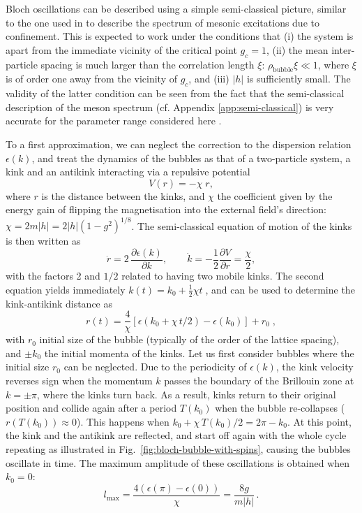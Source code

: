 \documentclass[amsmath,amssymb,11pt]{article}
\numberwithin{equation}{section}
\numberwithin{figure}{section}
\numberwithin{table}{section}
\begin{document}
{Bloch oscillations can be described using a simple semi-classical picture, similar to the one used in \cite{2008JSP...131..917R} to describe the spectrum of mesonic excitations due to confinement. This is expected to work under the conditions that (i) the system is apart from the immediate vicinity of the critical point $g_c=1$, (ii) the mean inter-particle spacing is much larger than the correlation length $\xi$: $\rho_\mathrm{bubble}\xi\ll 1$, where $\xi$ is of order one away from the vicinity of $g_c$, and (iii) $|h|$ is sufficiently small. The validity of the latter condition can be seen from the fact that the semi-classical description of the meson spectrum (cf. Appendix \ref{app:semi-classical}) is very accurate for the parameter range  considered here \cite{2017NatPh..13..246K}.
}

To a first approximation, we can neglect the correction to the dispersion 
relation $\epsilon(k)$,  and treat the dynamics of the bubbles as that of a two-particle system, a kink and an antikink interacting via a repulsive potential
\begin{equation}
V(r)=-\chi \;r,
\end{equation}
where $r$ is the distance between the kinks, and $\chi$ the coefficient  given by the energy gain of flipping the magnetisation into the external field's direction:  $\chi= 2 m |h| =  2|h|\left(1-g^{2}\right)^{1/8}$. The semi-classical equation
of motion of the kinks is then written as
\begin{equation}
\dot r = 2 \, \frac{\partial\epsilon(k)}{\partial k}, \quad\quad
\dot k = -\frac 1 2 \frac{\partial V}{\partial  r}= \frac \chi 2, 
\end{equation}
{with the factors 2 and $1/2$ related to having two mobile kinks}.
The second equation yields immediately $k(t)=k_{0}+\frac{1}{2} \chi t\;$, and can be used to determine the  kink-antikink distance as 
\begin{equation}
r(t)=\frac{4}{\chi}\left[\epsilon\left(k_{0}+ \chi\, t/2\right)-\epsilon\left(k_{0}\right)\right]+r_{0}\;,
\end{equation}
with $r_{0}$ initial size of the bubble (typically of the order of the lattice spacing), and $\pm k_{0}$  the initial momenta of the kinks. {Let us first consider bubbles where the initial size $r_0$ can be neglected.} Due to the periodicity of $\epsilon(k)$, the kink velocity reverses sign when the momentum $k$ passes the boundary of the Brillouin zone at $k=\pm\pi$, where the kinks turn back. As a result, kinks return to their original position and collide again after a period $T(k_0)$  when the bubble re-collapses ($r(T(k_0))\approx 0$). This happens when $k_{0}+\chi \,T(k_0)/{2} =2 \pi-k_{0}$. 
At this point,  the kink and the antikink are reflected, and start off again with the whole cycle repeating as illustrated in Fig.~\ref{fig:bloch-bubble-with-spins}, causing the bubbles oscillate in time.
The maximum amplitude of these oscillations is obtained when $k_0=0$: 
\begin{equation}
l_\mathrm{max}=\frac{4(\epsilon(\pi)-\epsilon(0))}{\chi}=\frac{8g}{m|h|} \, .
\label{eq:max_bloch_oscillation_length}
\end{equation}
\end{document}
